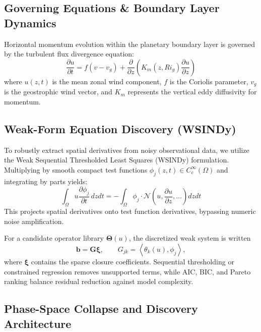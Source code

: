 \documentclass[11pt,a4paper]{article}
\begin{document}
\subsection{Governing Equations \& Boundary Layer Dynamics}

Horizontal momentum evolution within the planetary boundary layer is governed by the turbulent flux divergence equation:
\begin{equation}
    \frac{\partial u}{\partial t} = f(v - v_g) + \frac{\partial}{\partial z} \left( K_m(z, Ri_g) \frac{\partial u}{\partial z} \right)
\end{equation}
where $u(z,t)$ is the mean zonal wind component, $f$ is the Coriolis parameter, $v_g$ is the geostrophic wind vector, and $K_m$ represents the vertical eddy diffusivity for momentum.

\subsection{Weak-Form Equation Discovery (WSINDy)}

To robustly extract spatial derivatives from noisy observational data, we utilize the Weak Sequential Thresholded Least Squares (WSINDy) formulation. Multiplying by smooth compact test functions $\phi_j(z,t) \in C_c^\infty(\Omega)$ and integrating by parts yields:
\begin{equation}
    \int_{\Omega} u \frac{\partial \phi_j}{\partial t} \, dz dt = - \int_{\Omega} \phi_j \cdot \mathcal{N}\left(u, \frac{\partial u}{\partial z}, \dots \right) dz dt
\end{equation}
This projects spatial derivatives onto test function derivatives, bypassing numeric noise amplification.

For a candidate operator library $\boldsymbol{\Theta}(u)$, the discretized weak system is written
\begin{equation}
    \mathbf{b} = \mathbf{G}\boldsymbol{\xi},
    \qquad
    G_{jk} = \left\langle \theta_k(u), \phi_j \right\rangle,
\end{equation}
where $\boldsymbol{\xi}$ contains the sparse closure coefficients. Sequential thresholding or constrained regression removes unsupported terms, while AIC, BIC, and Pareto ranking balance residual reduction against model complexity.

\subsection{Phase-Space Collapse and Discovery Architecture}
\end{document}
